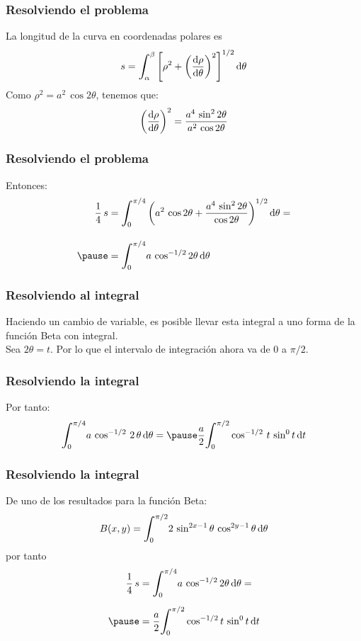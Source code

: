 \documentclass[12pt]{beamer}
\begin{document}
\begin{frame}
\frametitle{Resolviendo el problema}
La longitud de la curva en coordenadas polares es
\begin{align*}
s = \scaleint{6ex}_{\bs \alpha}^{\beta} \left[ \rho^{2} + \left( \dv{\rho}{\theta} \right)^{2} \right]^{1/2} \dd{\theta}
\end{align*}
\pause
Como $\rho^{2} = a^{2} \, \cos 2 \theta$, tenemos que:
\begin{align*}
\left( \dv{\rho}{\theta} \right)^{2} = \dfrac{a^{4} \, \sin^{2} 2 \theta}{a^{2} \, \cos 2 \theta}
\end{align*}
\end{frame}
\begin{frame}
\frametitle{Resolviendo el problema}
Entonces:
\begin{eqnarray*}
\begin{aligned}
\dfrac{1}{4} \, s &= \scaleint{6ex}_{\bs {0}}^{\pi/4} \left( a^{2} \, \cos 2 \theta + \dfrac{a^{4} \, \sin^{2} 2 \theta}{\cos 2 \theta} \right)^{1/2} \dd{\theta} = \\[1em] \pause
&= \scaleint{6ex}_{\bs {0}}^{\pi/4} a \, \cos^{-1/2} 2 \theta \dd{\theta}
\end{aligned}
\end{eqnarray*}
\end{frame}
\begin{frame}
\frametitle{Resolviendo al integral}
Haciendo un cambio de variable, es posible llevar esta integral a uno forma de la función Beta con integral.
\\
\bigskip
\pause
Sea $2 \theta = t$. Por lo que el intervalo de integración ahora va de $0$ a $\pi/2$.
\end{frame}
\begin{frame}
\frametitle{Resolviendo la integral}
Por tanto:
\begin{eqnarray*}
\begin{aligned}
\scaleint{6ex}_{\bs 0}^{\pi/4} a \, \cos^{-1/2} \, 2 \, \theta \dd{\theta} = \pause \dfrac{a}{2} \scaleint{6ex}_{\bs {0}}^{\pi/2} \cos^{-1/2} \, t \, \sin^{0} t \dd{t}
\end{aligned}
\end{eqnarray*}
\end{frame}
\begin{frame}
\frametitle{Resolviendo la integral}
De uno de los resultados para la función Beta:
\begin{align*}
B(x, y) = \scaleint{6ex}_{\bs {0}}^{\pi/2} 2 \, \sin^{2x-1} \theta \, \cos^{2y-1} \theta \dd{\theta}
\end{align*}
\pause
por tanto
\begin{eqnarray*}
\begin{aligned}
\dfrac{1}{4} \, s &= \scaleint{6ex}_{\bs {0}}^{\pi/4} a \, \cos^{-1/2} 2 \theta \dd{\theta} =  \\[0.5em] \pause
&= \dfrac{a}{2} \scaleint{6ex}_{\bs {0}}^{\pi/2} \cos^{-1/2} t \, \sin^{0} t \dd{t}
\end{aligned}
\end{eqnarray*}
\end{frame}
\end{document}
